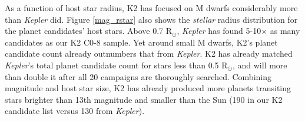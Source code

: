 \documentclass[twocolumn]{aastex62}
\newcommand{\project}[1]{\textsl{#1}}
\newcommand{\nsmallbright}{190}
\begin{document}
As a function of host star radius, K2 has focused on M dwarfs
considerably more than \project{Kepler} did. Figure \ref{mag_rstar}
also shows the \textit{stellar} radius distribution for the planet
candidates' host stars. Above 0.7 R$_\odot$, \project{Kepler} has
found 5-10$\times$ as many candidates as our K2 C0-8 sample. Yet
around small M dwarfs, K2's planet candidate count already outnumbers
that from \project{Kepler}. K2 has already matched \project{Kepler}'s
total planet candidate count for stars less than 0.5 R$_\odot$, and
will more than double it after all 20 campaigns are thoroughly
searched.  Combining magnitude and host star size, K2 has already
produced more planets transiting stars brighter than 13th magnitude
and smaller than the Sun (\nsmallbright{} in our K2 candidate list
versus 130 from \project{Kepler}).
\end{document}
